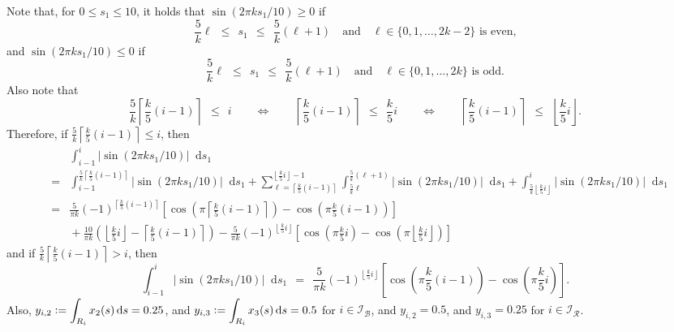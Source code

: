 \documentclass[article]{jss}
\def\defi{\vcentcolon=}
\def\diff{\mathop{}\!\mathrm{d}}
\begin{document}
Note that, for $0 \leq s_{1} \leq 10$, it holds that $\sin(2 \pi k s_{1} / 10) \geq 0$ if
\[
\frac{5}{k} \ell \ \ \leq \ \ s_{1} \ \ \leq \ \ \frac{5}{k} (\ell + 1)
\quad \mbox{and} \quad \ell \in \{0,1,\ldots,2k-2\} \mbox{ is even,}
\]
and $\sin(2 \pi k s_{1} / 10) \leq 0$ if
\[
\frac{5}{k} \ell \ \ \leq \ \ s_{1} \ \ \leq \ \ \frac{5}{k} (\ell + 1)
\quad \mbox{and} \quad \ell \in \{0,1,\ldots,2k\} \mbox{ is odd.}
\]
Also note that
\[
\frac{5}{k} \left\lceil \frac{k}{5} (i-1) \right\rceil \ \ \le \ \ i
\qquad \Longleftrightarrow \qquad \left\lceil \frac{k}{5} (i-1) \right\rceil \ \ \le \ \ \frac{k}{5} i
\qquad \Longleftrightarrow \qquad \left\lceil \frac{k}{5} (i-1) \right\rceil \ \ \le \ \ \left\lfloor \frac{k}{5} i \right\rfloor.
\]
Therefore, if $\frac{5}{k} \left\lceil \frac{k}{5} (i-1) \right\rceil \le i$, then
\begin{eqnarray*}
& & \int_{i-1}^{i} |\sin(2 \pi k s_{1} / 10)| \diff s_{1} \\
& = & \int_{i-1}^{\frac{5}{k} \left\lceil \frac{k}{5} (i-1) \right\rceil} |\sin(2 \pi k s_{1} / 10)| \diff s_{1} + \sum_{\ell = \left\lceil \frac{k}{5} (i-1) \right\rceil}^{\left\lfloor \frac{k}{5} i \right\rfloor - 1} \int_{\frac{5}{k} \ell}^{\frac{5}{k} (\ell+1)} |\sin(2 \pi k s_{1} / 10)| \diff s_{1} +
\int_{\frac{5}{k} \left\lfloor \frac{k}{5} i \right\rfloor}^{i} |\sin(2 \pi k s_{1} / 10)| \diff s_{1} \\
& = & \frac{5}{\pi k} \left(-1\right)^{\left\lceil \frac{k}{5} (i-1) \right\rceil} \left[\cos\left(\pi \left\lceil \frac{k}{5} (i-1) \right\rceil\right) - \cos\left(\pi \frac{k}{5} (i-1)\right)\right] \\
& & {} + \frac{10}{\pi k} \left(\left\lfloor \frac{k}{5} i \right\rfloor - \left\lceil \frac{k}{5} (i-1) \right\rceil\right) - \frac{5}{\pi k} \left(-1\right)^{\left\lfloor \frac{k}{5} i \right\rfloor} \left[\cos\left(\pi \frac{k}{5} i\right) - \cos\left(\pi \left\lfloor \frac{k}{5} i \right\rfloor\right)\right]
\end{eqnarray*}
and if $\frac{5}{k} \left\lceil \frac{k}{5} (i-1) \right\rceil > i$, then
\[
\int_{i-1}^{i} |\sin(2 \pi k s_{1} / 10)| \diff s_{1}
\ \ = \ \ \frac{5}{\pi k} \left(-1\right)^{\left\lfloor \frac{k}{5} i \right\rfloor} \left[\cos\left(\pi \frac{k}{5} (i-1)\right) - \cos\left(\pi \frac{k}{5} i\right)\right].
\]
Also, $y_{i,2} \defi \displaystyle \int_{R_{i}} x_{2}(s) \diff s = 0.25$, and $y_{i,3} \defi \displaystyle \int_{R_{i}} x_{3}(s) \diff s = 0.5$ for $i \in \mathcal{I}_{\mathcal{B}}$, and $y_{i,2} = 0.5$, and $y_{i,3} = 0.25$ for $i \in \mathcal{I}_{\mathcal{R}}$.
\end{document}
